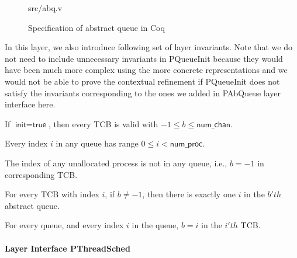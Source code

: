\begin{figure}
	 {src/abq.v}
	\caption{Specification of abstract queue in Coq}
	\label{fig:abq_v}
\end{figure}

In this layer, we also introduce following set of layer invariants. Note that we do not need to include unnecessary
invariants in PQueueInit because they would have been much more complex using the more concrete
representations and we would not be able to prove the contextual refinement if PQueueInit does not satisfy
the invariants corresponding to the ones we added in PAbQueue layer interface here.

\begin{invariant}
If $\textsf{init}=\textsf{true}$, then every TCB is valid with $-1\le b \le \textsf{num\_chan}$.
\end{invariant}

\begin{invariant}
Every index $i$ in any queue has range $0\le i < \textsf{num\_proc}$.
\end{invariant}

\begin{invariant}
The index of any unallocated process is not in any queue, i.e., $b=-1$ in corresponding TCB.
\end{invariant}

\begin{invariant}
For every TCB with index $i$, if $b\neq -1$, then there is exactly one $i$ in the $b'th$ abstract queue.
\end{invariant}

\begin{invariant}
For every queue, and every index $i$ in the queue, $b=i$ in the $i'th$ TCB.
\end{invariant}

\paragraph{Layer Interface PThreadSched}

